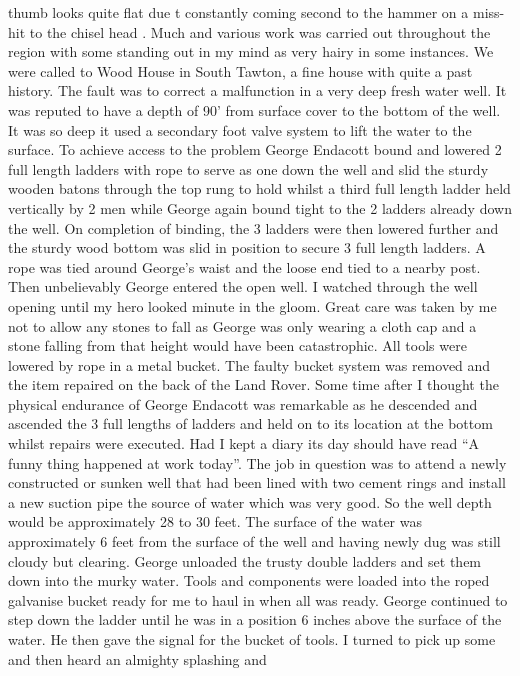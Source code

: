thumb looks quite flat due t constantly coming second to the hammer on a
miss-hit to the chisel head . Much and various work was carried out throughout
the region with some standing out in my mind as very hairy in some instances.
We were called to Wood House in South Tawton, a fine house with quite a past
history. The fault was to correct a malfunction in a very deep fresh water
well. It was reputed to have a depth of 90' from surface cover to the bottom of
the well. It was so deep it used a secondary foot valve system to lift the
water to the surface. To achieve access to the problem George Endacott bound
and lowered 2 full length ladders with rope to serve as one down the well and
slid the sturdy wooden batons through the top rung to hold whilst a third full
length ladder held vertically by 2 men while George again bound tight to the 2
ladders already down the well. On completion of binding, the 3 ladders were
then lowered further and the sturdy wood bottom was slid in position to secure
3 full length ladders. A rope was tied around George's waist and the loose end
tied to a nearby post. Then unbelievably George entered the open well. I
watched through the well opening until my hero looked minute in the gloom.
Great care was taken by me not to allow any stones to fall as George was only
wearing a cloth cap and a stone falling from that height would have been
catastrophic. All tools were lowered by rope in a metal bucket. The faulty
bucket system was removed and the item repaired on the back of the Land Rover.
Some time after I thought the physical endurance of George Endacott was
remarkable as he descended and ascended the 3 full lengths of ladders and held
on to its location at the bottom whilst repairs were executed. Had I kept a
diary its day should have read ``A funny thing happened at work today''. The
job in question was to attend a newly constructed or sunken well that had been
lined with two cement rings and install a new suction pipe the source of water
which was very good. So the well depth would be approximately 28 to 30 feet.
The surface of the water was approximately 6 feet from the surface of the well
and having newly dug was still cloudy but clearing. George unloaded the trusty
double ladders and set them down into the murky water. Tools and components
were loaded into the roped galvanise bucket ready for me to haul in when all
was ready. George continued to step down the ladder until he was in a position
6 inches above the surface of the water. He then gave the signal for the bucket
of tools. I turned to pick up some and then heard an almighty splashing and
